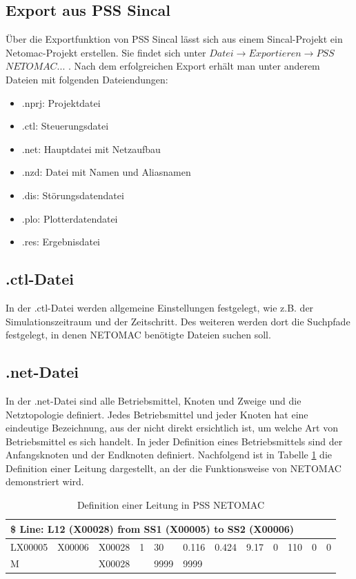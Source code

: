 \documentclass{scrartcl}
\begin{document}
\begin{onehalfspace}
\subsection{Export aus PSS Sincal}
Über die Exportfunktion von PSS Sincal lässt sich aus einem Sincal-Projekt ein Netomac-Projekt erstellen. Sie findet sich unter $Datei \rightarrow Exportieren \rightarrow PSS$ $NETOMAC...$ .  Nach dem erfolgreichen Export erhält man unter anderem  Dateien mit folgenden Dateiendungen:

\begin{itemize}
\item .nprj: Projektdatei
\item .ctl: Steuerungsdatei
\item .net: Hauptdatei mit Netzaufbau
\item .nzd: Datei mit Namen und Aliasnamen
\item .dis: Störungsdatendatei
\item .plo: Plotterdatendatei
\item .res: Ergebnisdatei
\end{itemize}


\subsection{.ctl-Datei}
In der .ctl-Datei werden allgemeine Einstellungen festgelegt, wie z.B. der Simulationszeitraum und der Zeitschritt. Des weiteren werden dort die Suchpfade festgelegt, in denen NETOMAC benötigte Dateien suchen soll.

\subsection{.net-Datei}
In der .net-Datei sind alle Betriebsmittel, Knoten und Zweige und die Netztopologie definiert. Jedes Betriebsmittel und jeder Knoten hat eine eindeutige Bezeichnung, aus der nicht direkt ersichtlich ist, um welche Art von Betriebsmittel es sich handelt. In jeder Definition eines Betriebsmittels sind der Anfangsknoten und der Endknoten definiert. Nachfolgend ist in Tabelle \ref{leitung-netomac-tb} die Definition einer Leitung dargestellt, an der die Funktionsweise von NETOMAC demonstriert wird.

\begin{table}[H]
\begin{tabular}{|l|l|l|l|l|l|l|l|l|l|l|l|}
\hline 
\multicolumn{12}{|l|}{\$ Line: L12 (X00028) from SS1 (X00005) to SS2 (X00006)} \\ 
\hline 
LX00005 & X00006  & X00028 & 1 & 30 & 0.116 & 0.424 & 9.17 & 0 & 110 & 0 &0 \\ 
\hline 
M & & X00028 & & 9999 & 9999 & & & & & & \\ 
\hline 
\end{tabular} 
\caption{Definition einer Leitung in PSS NETOMAC}
\label{leitung-netomac-tb}
\end{table}


\end{onehalfspace}
\end{document}
